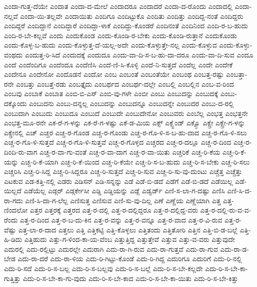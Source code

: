 {ಎಂದಾ-ಗುತ್ತ-ದೆಯೇ
ಎಂದಾತ
ಎಂದಾ-ದ-ಮೇಲೆ
ಎಂದಾದರೂ
ಎಂದಾದರೆ
ಎಂದಾ-ದ-ರೊಂದು
ಎಂದಾದಲ್ಲಿ
ಎಂದಾ-ನಲ್ಲವೆ
ಎಂದಾ-ಯಿ-ತಲ್ಲವೇ
ಎಂದಾಯಿತು
ಎಂದಿಗೂ
ಎಂದಿಟ್ಟುಕೊ
ಎಂದಿತು
ಎಂದಿತ್ತು
ಎಂದಿದ್ದ-ನಂತೆ
ಎಂದಿದ್ದರು
ಎಂದಿದ್ದರೆ
ಎಂದಿದ್ದಾನೆ
ಎಂದಿದ್ದಾರೆ
ಎಂದಿದ್ದಾ-ಳಾಕೆ
ಎಂದಿದ್ದು-ಕೊಂಡರೆ
ಎಂದಿನಂತೆ
ಎಂದಿನಿಂದ
ಎಂದಿ-ರ-ಬ-ಹುದು
ಎಂದಿ-ರ-ಬೇ-ಕಲ್ಲವೆ
ಎಂದು
ಎಂದುಕೊಂಡ
ಎಂದು-ಕೊಂಡಿ-ರ-ಬೇಕು
ಎಂದು-ಕೊಂಡಿ-ರುತ್ತಾನೆ
ಎಂದುಕೊಂಡು
ಎಂದು-ಕೊಳ್ಳ-ಬ-ಹುದು
ಎಂದು-ಕೊಳ್ಳುತ್ತ-ದೆ-ಯಲ್ಲ-ಅದೇ
ಎಂದು-ಕೊಳ್ಳುತ್ತೇ-ನಲ್ಲ
ಎಂದು-ಕೊಳ್ಳುವ
ಎಂದು-ಕೊಳ್ಳು-ವಂಥದು
ಎಂದುತ್ತ-ರಿ-ಸಿದೆ
ಎಂದುದಕ್ಕೆ
ಎಂದುದೂ
ಎಂದು-ವಾ-ದಿ-ಸ-ಬ-ಹು-ದಾ-ದರೂ
ಎಂದು-ವಾ-ದಿ-ಸುವ
ಎಂದೂ
ಎಂದೆ
ಎಂದೆಂದಿಗೂ
ಎಂದೆಂದೂ
ಎಂದೆಣಿಸಿ
ಎಂದೆ-ಣಿ-ಸಿ-ಕೊಳ್ಳಿ
ಎಂದೆ-ನಿ-ಸುತ್ತದೆ
ಎಂದೆಲ್ಲ
ಎಂದೇ
ಎಂದೇಕೆ
ಎಂದೇನೂ
ಎಂದೇನೋ
ಎಂದೊಡನೆ
ಎಂದೋ
ಎಂಬ
ಎಂಬಂತೆ
ಎಂಬಂತೆಯೇ
ಎಂಬಂಥ
ಎಂಬತ್ತ-ರಷ್ಟು
ಎಂಬತ್ತಾ-ರನೇ
ಎಂಬತ್ತು
ಎಂಬತ್ತೆ-ರಡು
ಎಂಬತ್ತೈದು
ಎಂಬರ್ಥದ
ಎಂಬರ್ಥ-ದಲ್ಲೇ
ಎಂಬಲ್ಲಿ
ಎಂಬಲ್ಲಿನ
ಎಂಬ-ವ-ರಿಂದ
ಎಂಬವು
ಎಂಬಾಕೆ
ಎಂಬಾತ
ಎಂಬಿ-ಬಿ-ಎಸ್
ಎಂಬಿ-ವು-ಗಳೇ
ಎಂಬೀ
ಎಂಬು
ಎಂಬುದನ್ನು
ಎಂಬುದಕ್ಕೆ
ಎಂಬು-ದಕ್ಕೊಂದು
ಎಂಬುದನು
ಎಂಬು-ದನ್ನಲ್ಲ
ಎಂಬುದನ್ನು
ಎಂಬುದನ್ನೂ
ಎಂಬುದನ್ನೇ
ಎಂಬುದರ
ಎಂಬು-ದ-ರಲ್ಲಿ
ಎಂಬುದಾಗಿ
ಎಂಬುದು
ಎಂಬುದೂ
ಎಂಬುದೆ
ಎಂಬುದೇ
ಎಂಬುದೇನೋ
ಎಂಬುವರು
ಎಂಬೆಲ್ಲ
ಎಂಭತ್ತ
ಎಂಭತ್ತನೇ
ಎಂಭತ್ತ-ಮೂ-ರನೇ
ಎಕ-ರೆ-ಗ-ಳನ್ನು
ಎಕ-ರೆ-ಗ-ಳಷ್ಟು
ಎಕೆ-ಡ-ಮಿಯ
ಎಕ್ಸ್
ಎಕ್ಸ್ಟೆಂಡ್
ಎಕ್ಸ್ಪೊ
ಎಕ್ಸ್ರೇ
ಎಕ್ಸ್ರೇ-ಗ-ಳನ್ನು
ಎಕ್ಸ್ರೇನಲ್ಲಿ
ಎಚ್
ಎಚ್ಚರ
ಎಚ್ಚ-ರ-ಗೊಂಡ
ಎಚ್ಚ-ರ-ಗೊಂಡು
ಎಚ್ಚ-ರ-ಗೊ-ಳಿ-ಸ-ಬ-ಹು-ದಾದ
ಎಚ್ಚ-ರ-ಗೊ-ಳಿ-ಸಲು
ಎಚ್ಚ-ರ-ಗೊ-ಳಿ-ಸುತ್ತದೆ
ಎಚ್ಚ-ರ-ಗೊ-ಳಿ-ಸುತ್ತವೆ
ಎಚ್ಚ-ರ-ಗೊಳ್ಳದ
ಎಚ್ಚರದ
ಎಚ್ಚ-ರ-ದಲ್ಲೂ
ಎಚ್ಚ-ರ-ದಿಂದ
ಎಚ್ಚ-ರ-ದಿಂದಿ-ರು-ವಾಗ
ಎಚ್ಚ-ರ-ವಾ-ಗು-ವಂತೆ
ಎಚ್ಚ-ರ-ವಾ-ದಾಗ
ಎಚ್ಚ-ರ-ವಾ-ಯಿತು
ಎಚ್ಚರಿಕೆ
ಎಚ್ಚ-ರಿ-ಕೆಯ
ಎಚ್ಚ-ರಿ-ಕೆ-ಯನ್ನು
ಎಚ್ಚ-ರಿ-ಕೆ-ಯಾಗಿ
ಎಚ್ಚ-ರಿ-ಕೆ-ಯಿಂದ
ಎಚ್ಚ-ರಿ-ಕೆಯೇ
ಎಚ್ಚ-ರಿ-ಸ-ಬ-ಹುದು
ಎಚ್ಚ-ರಿ-ಸ-ಬೇಕು
ಎಚ್ಚ-ರಿ-ಸಲು
ಎಚ್ಚರಿಸಿ
ಎಚ್ಚ-ರಿ-ಸಿದ್ದ
ಎಚ್ಚ-ರಿ-ಸಿದ್ದರೂ
ಎಚ್ಚ-ರಿ-ಸುತ್ತದೆ
ಎಚ್ಚ-ರಿ-ಸುವ
ಎಚ್ಚ-ರಿ-ಸು-ವು-ದುಂಟು
ಎಚ್ಚೆತ್ತ
ಎಚ್ಚೆತ್ತು
ಎಟಕುವ
ಎಡ-ಕತ್ತಿ-ನಲ್ಲಿ
ಎಡರು
ಎಡಿಸನ್
ಎಡಿ-ಸನ್ನನ್ನು
ಎಡೆ
ಎಡೆ-ಬಿ-ಡದೆ
ಎಡೆಗೆ
ಎಡೆ-ಬಿ-ಡದೆ
ಎಡೆಯಿಲ್ಲ
ಎಡೆ-ಯಿಲ್ಲದೆ
ಎಡೆಯೆಲ್ಲ
ಎಡ್ಗರ್
ಎಡ್ಗರ್ಕೇಸೀ
ಎಡ್ಡಿ
ಎಡ್ಡಿಯನ್ನು
ಎಡ್ಲೆ
ಎಡ್ವರ್ಡ್
ಎಣಿ-ಸ-ಲಾ-ಗ-ದಷ್ಟು
ಎಣಿಸಿ
ಎಣಿ-ಸಿ-ದ-ರಾ-ಗದು
ಎಣಿ-ಸಿ-ದಾ-ಗ-ಲೆಲ್ಲ
ಎಣಿಸುತ್ತ
ಎಣಿಸುವ
ಎಣಿ-ಸು-ವು-ದಿಲ್ಲ
ಎಣೆ
ಎಣ್ಣೆಯ
ಎಣ್ಣೆಯಾಗಿ
ಎತ್ತ
ಎತ್ತ-ಣಿಂದಲೋ
ಎತ್ತರ
ಎತ್ತರಕ್ಕೆ
ಎತ್ತರದ
ಎತ್ತ-ರ-ದಲ್ಲಿ
ಎತ್ತ-ರ-ದಲ್ಲಿದ್ದರೂ
ಎತ್ತ-ರ-ದಲ್ಲಿದ್ದ-ವರು
ಎತ್ತ-ರ-ದಲ್ಲಿ-ರು-ವ-ವ-ರೆಂದು
ಎತ್ತ-ರ-ದಿಂದ
ಎತ್ತ-ರ-ಬ-ದು-ಕಿನ
ಎತ್ತ-ರ-ವನ್ನು
ಎತ್ತ-ರ-ವನ್ನೂ
ಎತ್ತ-ರ-ವಾದ
ಎತ್ತ-ರ-ವಿ-ರುವ
ಎತ್ತ-ರ-ವೆಷ್ಟು
ಎತ್ತ-ಲಾ-ರ-ದಾದ
ಎತ್ತಲು
ಎತ್ತಿ
ಎತ್ತಿಕಟ್ಟಿ
ಎತ್ತಿ-ಕೊಳ್ಳಲು
ಎತ್ತಿತಂದು
ಎತ್ತಿತೋರಿ
ಎತ್ತಿನ
ಎತ್ತಿ-ಬಿ-ಡ-ಬಲ್ಲೆ
ಎತ್ತಿ-ಹಿ-ಡಿದು
ಎತ್ತಿಹುದು
ಎತ್ತು-ಗ-ಳಿಂದ-ಕಾ-ಯ-ವೆಂಬ
ಎತ್ತುತ್ತಿದ್ದ
ಎತ್ತುತ್ತೇವೆ
ಎತ್ತುವ
ಎತ್ತು-ವ-ವರು
ಎತ್ತುವುದೇ
ಎದುರಲ್ಲಿ
ಎದು-ರಲ್ಲಿಟ್ಟು
ಎದುರಲ್ಲೇ
ಎದುರಾಗಿ
ಎದು-ರಾ-ಗಿ-ರುವ
ಎದು-ರಾ-ಗುತ್ತವೆ
ಎದು-ರಾ-ಗುವ
ಎದು-ರಾ-ಡ-ಬೇಡ
ಎದು-ರಾ-ದರೆ
ಎದು-ರಾ-ಳಿಯ
ಎದು-ರಿ-ಗಿಟ್ಟು-ಕೊಂಡೆ
ಎದು-ರಿ-ಗಿದ್ದ
ಎದುರಿಗೂ
ಎದುರಿಗೆ
ಎದು-ರಿ-ನಲ್ಲಿ
ಎದು-ರಿ-ಸದೆ
ಎದು-ರಿ-ಸ-ಬಲ್ಲ
ಎದು-ರಿ-ಸ-ಬಲ್ಲವು
ಎದು-ರಿ-ಸ-ಬಲ್ಲೆ
ಎದು-ರಿ-ಸ-ಬೇ-ಕಲ್ಲದೇ
ಎದು-ರಿ-ಸ-ಬೇ-ಕಾ-ಗುತ್ತಿತ್ತು
ಎದು-ರಿ-ಸ-ಬೇ-ಕಾ-ಗು-ವುದು
ಎದು-ರಿ-ಸ-ಬೇ-ಕಾದ
ಎದು-ರಿ-ಸ-ಬೇ-ಕಾ-ಯಿತು
ಎದು-ರಿ-ಸ-ಬೇ-ಕಿತ್ತು
}
